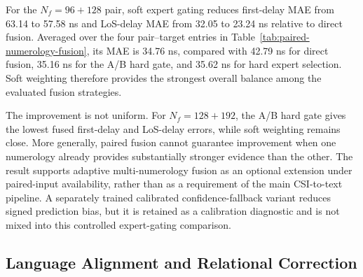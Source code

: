 \begin{table}[t]
\centering
\caption{Paired multi-numerology delay fusion from the same expert-gating experiment. Only fusion
outputs are shown. Lower is better, and underlining marks the best fusion result in each column.}
\label{tab:paired-numerology-fusion}
\small
\setlength{\tabcolsep}{6pt}
\end{table}

For the $N_f=96+128$ pair, soft expert gating reduces first-delay MAE from 63.14 to 57.58 ns
and LoS-delay MAE from 32.05 to 23.24 ns relative to direct fusion. Averaged over the four
pair--target entries in Table~\ref{tab:paired-numerology-fusion}, its MAE is 34.76 ns, compared
with 42.79 ns for direct fusion, 35.16 ns for the A/B hard gate, and 35.62 ns for hard expert
selection. Soft weighting therefore provides the strongest overall balance among the evaluated
fusion strategies.

The improvement is not uniform. For $N_f=128+192$, the A/B hard gate gives the lowest fused
first-delay and LoS-delay errors, while soft weighting remains close. More generally, paired fusion
cannot guarantee improvement when one numerology already provides substantially stronger evidence
than the other. The result supports adaptive multi-numerology fusion as an optional extension under
paired-input availability, rather than as a requirement of the main CSI-to-text pipeline. A separately
trained calibrated confidence-fallback variant reduces signed prediction bias, but it is retained as a
calibration diagnostic and is not mixed into this controlled expert-gating comparison.

\subsection{Language Alignment and Relational Correction}
\label{sec:appendix-language-shift}

